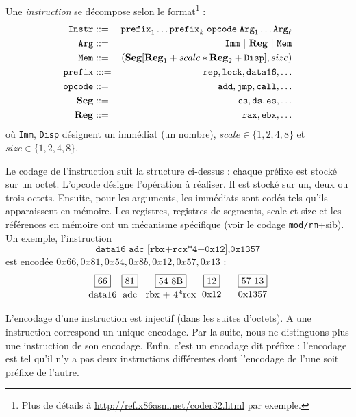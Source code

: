 \documentclass{book}
\newcommand{\code}[1]{\texttt{#1}}
\newcommand{\Reg}{{\mathbf{Reg}}}
\newcommand{\Seg}{{\mathbf{Seg}}}
\begin{document}
{Une \textit{instruction} se décompose selon le format\footnote{Plus de détails à \url{http://ref.x86asm.net/coder32.html} par exemple.} :%
\begin{eqnarray*}
	\Instr& ::=& \code{prefix}_1 \dots \code{prefix}_k \; \code{opcode} \; \code{Arg}_1 \dots \code{Arg}_\ell\\
	\code{Arg} &::=& \code{Imm}\ |\ \Reg\ |\ \code{Mem}\\
	\label{eq3} \code{Mem} &::=& (\Seg[\Reg_1+scale*\Reg_2+\code{Disp}], size)\\ 
	\code{prefix} &:::=& {\tt rep}, {\tt lock}, {\tt data16}, \ldots\\
	\code{opcode} &::=& {\tt add}, {\tt jmp}, {\tt call}, \ldots \\
	\Seg & ::=& {\tt cs}, {\tt ds}, {\tt es}, \ldots \\
	\Reg & ::=& {\tt rax}, {\tt ebx}, \ldots
\end{eqnarray*}
où \code{Imm}, \code{Disp} désignent un immédiat (un nombre), $scale\in\{1,2,4,8\}$ et $size\in\{1, 2, 4, 8\}$. 

Le codage de l'instruction suit la structure ci-dessus : chaque préfixe est stocké sur un octet. L'opcode désigne l'opération à réaliser. Il est stocké sur un, deux ou trois octets. Ensuite, pour les arguments, les immédiats sont codés tels qu'ils apparaissent en mémoire. Les registres, registres de segments, scale et size et les références en mémoire ont un mécanisme spécifique (voir le codage \code{mod/rm}+sib). Un exemple, l'instruction $$\code{data16 adc [rbx+rcx*4+0x12],0x1357}$$
est encodée $0x66,0x81,0x54,0x8b,0x12,0x57,0x13$ : 
$$
\begin{tikzpicture}
\node[draw,shape=rectangle] (A) at (0,0) {66};
\node (Aa) at (0,-0.5) {data16};
\node[draw,shape=rectangle] (B) at (1,0) {81};
\node (Ba) at (1,-0.5) {adc};
\node[draw,shape=rectangle] (C) at (2.5,0) {54 8B};
\node (Ca) at (2.5,-0.5) {rbx + 4*rcx};
\node[draw,shape=rectangle] (D) at (4,0) {12};
\node (Da) at (4,-0.5) {0x12};
\node[draw,shape=rectangle] (E) at (5.5,0) {57 13};
\node (Ea) at (5.5,-0.5) {0x1357};
\end{tikzpicture}
$$

L'encodage d'une instruction est injectif (dans les suites d'octets). A une instruction correspond un unique encodage. Par la suite, nous ne distinguons plus une instruction de son encodage.
Enfin, c'est un encodage dit préfixe :  l'encodage est tel qu'il n'y a pas deux instructions différentes dont l'encodage de l'une soit préfixe de l'autre. 

}
\end{document}
